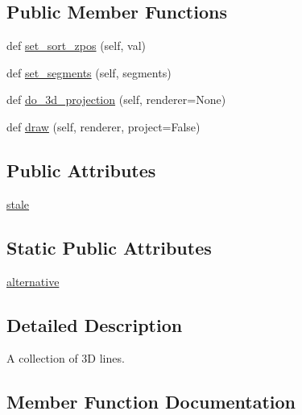 \subsection*{Public Member Functions}
\begin{DoxyCompactItemize}
\item 
def \hyperlink{classmplot3d_1_1art3d_1_1Line3DCollection_ae43f8a3356a58dc5162c96951b07ab0b}{set\+\_\+sort\+\_\+zpos} (self, val)
\item 
def \hyperlink{classmplot3d_1_1art3d_1_1Line3DCollection_a6b8eae8b6c743c35a2494fcc2ad00402}{set\+\_\+segments} (self, segments)
\item 
def \hyperlink{classmplot3d_1_1art3d_1_1Line3DCollection_aa30b2366331c8e9f1bb668a1bae11495}{do\+\_\+3d\+\_\+projection} (self, renderer=None)
\item 
def \hyperlink{classmplot3d_1_1art3d_1_1Line3DCollection_a21691d738ca52b08e53338ad4e3775b9}{draw} (self, renderer, project=False)
\end{DoxyCompactItemize}
\subsection*{Public Attributes}
\begin{DoxyCompactItemize}
\item 
\hyperlink{classmplot3d_1_1art3d_1_1Line3DCollection_a517ec73c590584954b0e114b038786b7}{stale}
\end{DoxyCompactItemize}
\subsection*{Static Public Attributes}
\begin{DoxyCompactItemize}
\item 
\hyperlink{classmplot3d_1_1art3d_1_1Line3DCollection_acf1de96ffda77be8df87e3fc39ff6ce8}{alternative}
\end{DoxyCompactItemize}


\subsection{Detailed Description}
\begin{DoxyVerb}A collection of 3D lines.
\end{DoxyVerb}
 

\subsection{Member Function Documentation}
\mbox{\label{classmplot3d_1_1art3d_1_1Line3DCollection_aa30b2366331c8e9f1bb668a1bae11495}} 
